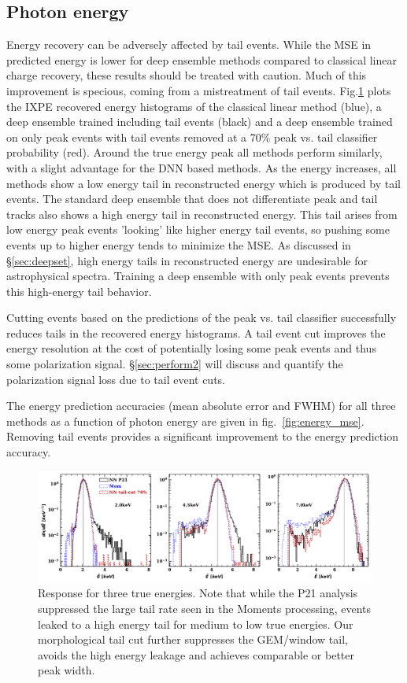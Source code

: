 \subsection{Photon energy} Energy recovery can be adversely affected by tail events. While the MSE in predicted energy is lower for deep ensemble methods compared to classical linear charge recovery, these results should be treated with caution. Much of this improvement is specious, coming from a mistreatment of tail events.
Fig.\ref{fig:energy_hist} plots the IXPE recovered energy histograms of the classical linear method (blue), a deep ensemble trained including tail events (black) and a deep ensemble trained on only peak events with tail events removed at a 70\% peak vs. tail classifier probability (red). Around the true energy peak all methods perform similarly, with a slight advantage for the DNN based methods. As the energy increases, all methods show a low energy tail in reconstructed energy which is produced by tail events. The standard deep ensemble that does not differentiate peak and tail tracks also shows a high energy tail in reconstructed energy. This tail arises from low energy peak events 'looking' like higher energy tail events, so pushing some events up to higher energy tends to minimize the MSE. As discussed in \S\ref{sec:deepset}, high energy tails in reconstructed energy are undesirable for astrophysical spectra. Training a deep ensemble with only peak events prevents this high-energy tail behavior.

Cutting events based on the predictions of the peak vs. tail classifier successfully reduces tails in the recovered energy histograms. A tail event cut improves the energy resolution at the cost of potentially losing some peak events and thus some polarization signal. \S\ref{sec:perform2} will discuss and quantify the polarization signal loss due to tail event cuts. 

The energy prediction accuracies (mean absolute error and FWHM) for all three methods as a function of photon energy are given in fig.~\ref{fig:energy_mse}. Removing tail events provides a significant improvement to the energy prediction accuracy.


\begin{figure}[t]
\centering
\includegraphics[width=1.0\textwidth]{figures/fig6.pdf}
\caption{Response for three true energies. Note that while the P21 analysis suppressed the large tail rate seen in the Moments processing, events leaked to a high energy tail for medium to low true energies. Our morphological tail cut further suppresses the GEM/window tail, avoids the high energy leakage and achieves comparable or better peak width.}
\label{fig:energy_hist}
\end{figure}

